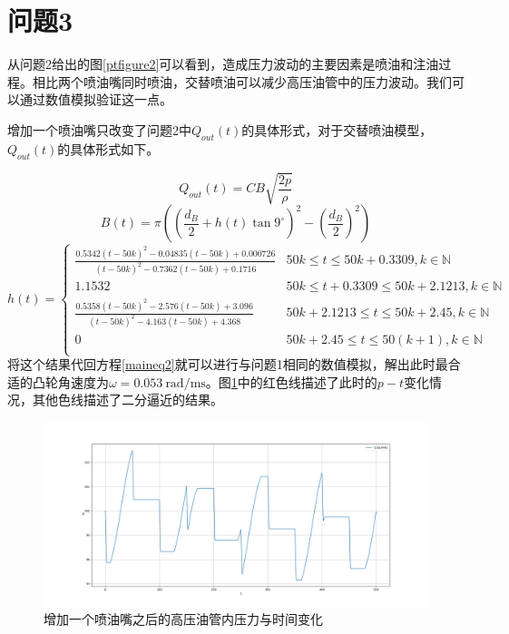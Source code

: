 \documentclass[12pt,AutoFakeBold]{article}%
\begin{document}
    \section{问题3}
    从问题2给出的图\ref{ptfigure2}可以看到，造成压力波动的主要因素是喷油和注油过程。相比两个喷油嘴同时喷油，交替喷油可以减少高压油管中的压力波动。我们可以通过数值模拟验证这一点。\par
    增加一个喷油嘴只改变了问题2中$Q_{out}(t)$的具体形式，对于交替喷油模型，$Q_{out}(t)$的具体形式如下。\par
    \begin{equation}
        Q_{out}(t)=CB\sqrt{\frac{2p}{\rho}}
    \end{equation}
    \begin{equation}
        B(t)=\pi\left(\left(\frac{d_B}{2}+h(t)\tan9^\circ\right)^2-\left(\frac{d_B}{2}\right)^2\right)
    \end{equation}
    \begin{equation}
        h(t)=
        \begin{cases}
            \frac{0.5342(t-50k)^2-0.04835(t-50k)+0.000726}{(t-50k)^2-0.7362(t-50k)+0.1716}&50k\leq t\leq 50k+0.3309,k\in\mathbb{N}\\
            1.1532&50k\leq t+0.3309\leq 50k+2.1213,k\in\mathbb{N}\\
            \frac{0.5358(t-50k)^2-2.576(t-50k)+3.096}{(t-50k)^2-4.163(t-50k)+4.368}&50k+2.1213\leq t\leq 50k+2.45,k\in\mathbb{N}\\
            0&50k+2.45\leq t\leq 50(k+1),k\in\mathbb{N}\\      
        \end{cases}
    \end{equation}
    将这个结果代回方程\ref{maineq2}就可以进行与问题1相同的数值模拟，解出此时最合适的凸轮角速度为$\omega=\SI{0.053}{\radian\per\ms}$。图\ref{ptfigure31}中的红色线描述了此时的$p-t$变化情况，其他色线描述了二分逼近的结果。\par
    \begin{figure}[H]
        \centering
        \includegraphics[scale=0.32]{figure/3-4.png}
        \caption{增加一个喷油嘴之后的高压油管内压力与时间变化}
        \label{ptfigure31}
    \end{figure}
\end{document}
